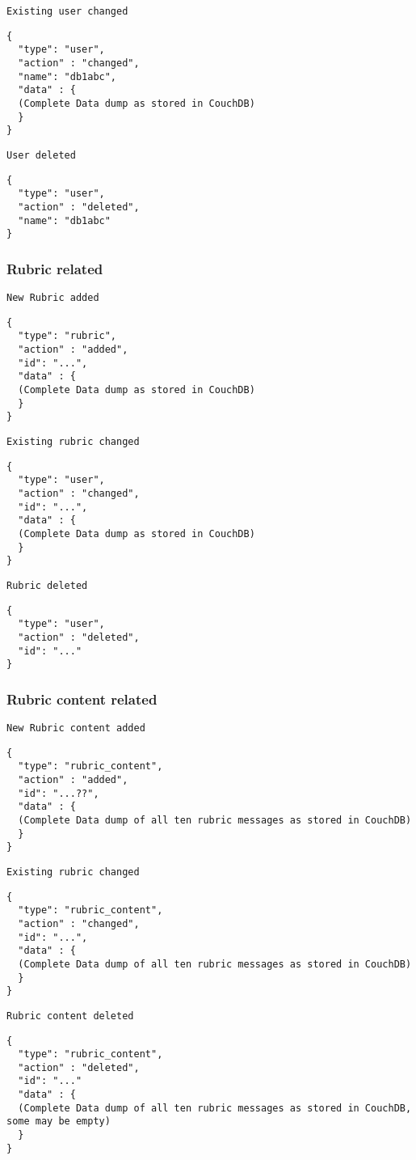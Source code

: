 \texttt{Existing user changed}
\begin{lstlisting}
{
  "type": "user",
  "action" : "changed",
  "name": "db1abc",
  "data" : {
  (Complete Data dump as stored in CouchDB)
  }
}
\end{lstlisting}

\texttt{User deleted}
\begin{lstlisting}
{
  "type": "user",
  "action" : "deleted",
  "name": "db1abc"
}
\end{lstlisting}


\subsubsection{Rubric related}
\texttt{New Rubric added}
\begin{lstlisting}
{
  "type": "rubric",
  "action" : "added",
  "id": "...",
  "data" : {
  (Complete Data dump as stored in CouchDB)
  }
}
\end{lstlisting}

\texttt{Existing rubric changed}
\begin{lstlisting}
{
  "type": "user",
  "action" : "changed",
  "id": "...",
  "data" : {
  (Complete Data dump as stored in CouchDB)
  }
}
\end{lstlisting}

\texttt{Rubric deleted}
\begin{lstlisting}
{
  "type": "user",
  "action" : "deleted",
  "id": "..."
}
\end{lstlisting}

\subsubsection{Rubric content related}

\texttt{New Rubric content added}
\begin{lstlisting}
{
  "type": "rubric_content",
  "action" : "added",
  "id": "...??",
  "data" : {
  (Complete Data dump of all ten rubric messages as stored in CouchDB)
  }
}
\end{lstlisting}

\texttt{Existing rubric changed}
\begin{lstlisting}
{
  "type": "rubric_content",
  "action" : "changed",
  "id": "...",
  "data" : {
  (Complete Data dump of all ten rubric messages as stored in CouchDB)
  }
}
\end{lstlisting}

\texttt{Rubric content deleted}
\begin{lstlisting}
{
  "type": "rubric_content",
  "action" : "deleted",
  "id": "..."
  "data" : {
  (Complete Data dump of all ten rubric messages as stored in CouchDB, some may be empty)
  }
}
\end{lstlisting}


